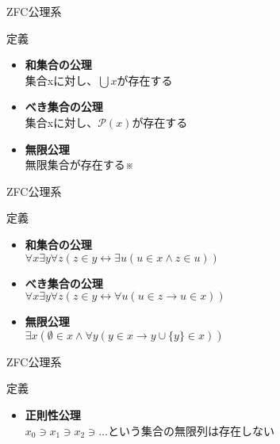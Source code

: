 \documentclass[17pt,aspectratio=169,xcolor=dvipsnames,table,dvipdfmx]{beamer}
\theoremstyle{definition}
\begin{document}
\begin{frame}{ZFC公理系}
    \begin{block}{定義}
        \begin{itemize}
            \item \textbf{和集合の公理} \\
                  集合xに対し、$\bigcup x$が存在する
            \item \textbf{べき集合の公理} \\
                  集合xに対し、$\mathcal{P}(x)$が存在する
            \item \textbf{無限公理} \\
                  無限集合が存在する※
        \end{itemize}
    \end{block}
\end{frame}

\begin{frame}{ZFC公理系}
    \begin{block}{定義}
        \begin{itemize}
            \item \textbf{和集合の公理} \\
                  $\forall x \exists y \forall z (z \in y \leftrightarrow \exists u (u \in x \land z \in u))$
            \item \textbf{べき集合の公理} \\
                  $ \forall x \exists y \forall z (z \in y \leftrightarrow \forall u (u \in z \rightarrow u \in x))$
            \item \textbf{無限公理} \\
                  $\exists x (\emptyset \in x \land \forall y (y \in x \rightarrow y \cup \{y\} \in x))$
        \end{itemize}
    \end{block}
\end{frame}

\begin{frame}{ZFC公理系}
    \begin{block}{定義}
        \begin{itemize}
            \item \textbf{正則性公理} \\
                  $x_0 \ni x_1 \ni x_2 \ni \dots$という集合の無限列は存在しない
        \end{itemize}
    \end{block}
\end{frame}
\end{document}
